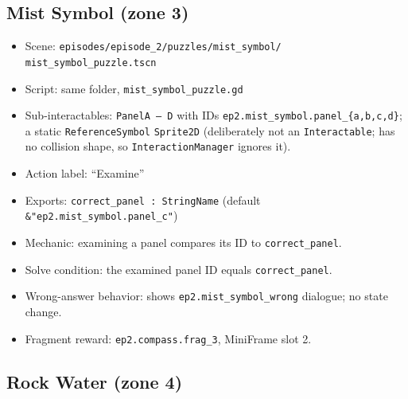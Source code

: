\documentclass[12pt, a4paper]{article}
\begin{document}
\subsection{Mist Symbol (zone 3)}

\begin{itemize}[nosep]
  \item Scene: \texttt{episodes/episode\_2/puzzles/mist\_symbol/} \texttt{mist\_symbol\_puzzle.tscn}
  \item Script: same folder, \texttt{mist\_symbol\_puzzle.gd}
  \item Sub-interactables: \texttt{PanelA\,--\,D} with IDs
        \texttt{ep2.mist\_symbol.panel\_\{a,b,c,d\}}; a static
        \texttt{ReferenceSymbol} \texttt{Sprite2D} (deliberately not an
        \texttt{Interactable}; has no collision shape, so
        \texttt{InteractionManager} ignores it).
  \item Action label: ``Examine''
  \item Exports: \texttt{correct\_panel : StringName} (default
        \texttt{\&"ep2.mist\_symbol.panel\_c"})
  \item Mechanic: examining a panel compares its ID to \texttt{correct\_panel}.
  \item Solve condition: the examined panel ID equals \texttt{correct\_panel}.
  \item Wrong-answer behavior: shows \texttt{ep2.mist\_symbol\_wrong} dialogue;
        no state change.
  \item Fragment reward: \texttt{ep2.compass.frag\_3}, MiniFrame slot 2.
\end{itemize}

\subsection{Rock Water (zone 4)}
\end{document}
